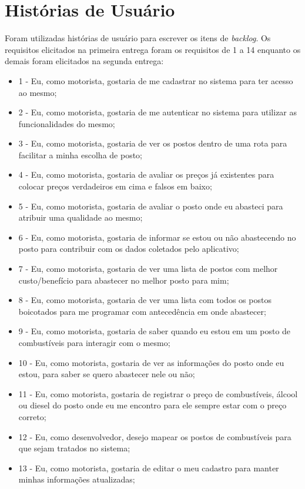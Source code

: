 \section{Histórias de Usuário}

Foram utilizadas histórias de usuário para escrever os itens de \textit{backlog}. Os requisitos elicitados na primeira entrega foram os requisitos de 1 a 14 enquanto os demais foram elicitados na segunda entrega:
\begin{itemize}
    \item 1 - Eu, como motorista, gostaria de me cadastrar no sistema para ter acesso ao mesmo;
    \item 2 - Eu, como motorista, gostaria de me autenticar no sistema para utilizar as funcionalidades do mesmo;
    \item 3 - Eu, como motorista, gostaria de ver os postos dentro de uma rota para facilitar a minha escolha de posto;
    \item 4 - Eu, como motorista, gostaria de avaliar os preços já existentes para colocar preços verdadeiros em cima e falsos em baixo;
    \item 5 - Eu, como motorista, gostaria de avaliar o posto onde eu abasteci para atribuir uma qualidade ao mesmo;
    \item 6 - Eu, como motorista, gostaria de informar se estou ou não abastecendo no posto para contribuir com os dados coletados pelo aplicativo;
    \item 7 - Eu, como motorista, gostaria de ver uma lista de postos com melhor custo/benefício para abastecer no melhor posto para mim;
    \item 8 - Eu, como motorista, gostaria de ver uma lista com todos os postos boicotados para me programar com antecedência em onde abastecer;
    \item 9 - Eu, como motorista, gostaria de saber quando eu estou em um posto de combustíveis para interagir com o mesmo;
    \item 10 - Eu, como motorista, gostaria de ver as informações do posto onde eu estou, para saber se quero abastecer nele ou não;
    \item 11 - Eu, como motorista, gostaria de registrar o preço de combustíveis, álcool ou diesel do posto onde eu me encontro para ele sempre estar com o preço correto;
    \item 12 - Eu, como desenvolvedor, desejo mapear os postos de combustíveis para que sejam tratados no sistema;
    \item 13 - Eu, como motorista, gostaria de editar o meu cadastro para manter minhas informações atualizadas;

\end{itemize}
